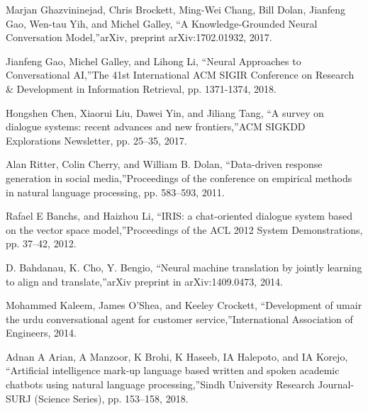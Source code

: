 \documentclass[conference]{IEEEtran}
\begin{document}
\begin{thebibliography}{00}
 Marjan Ghazvininejad, Chris Brockett, Ming-Wei Chang, Bill Dolan, Jianfeng Gao, Wen-tau Yih, and Michel Galley, \textquotedblleft A Knowledge-Grounded Neural Conversation Model,\textquotedblright \hspace{1mm}arXiv, preprint arXiv:1702.01932, 2017.

 Jianfeng Gao, Michel Galley, and Lihong Li, \textquotedblleft Neural Approaches to Conversational AI,\textquotedblright \hspace{1mm}The 41st International ACM SIGIR Conference on Research \& Development in Information Retrieval, pp. 1371-1374, 2018.

 Hongshen Chen, Xiaorui Liu, Dawei Yin, and Jiliang Tang, \textquotedblleft A survey on dialogue systems: recent advances and new frontiers,\textquotedblright \hspace{1mm}ACM SIGKDD Explorations Newsletter, pp. 25--35, 2017.

 Alan Ritter, Colin Cherry, and William B. Dolan, \textquotedblleft Data-driven response generation in social media,\textquotedblright \hspace{1mm}Proceedings of the conference on empirical methods in natural language processing, pp. 583--593, 2011.

 Rafael E Banchs, and Haizhou Li, \textquotedblleft IRIS: a chat-oriented dialogue system based on the vector space model,\textquotedblright \hspace{1mm}Proceedings of the ACL 2012 System Demonstrations, pp. 37--42, 2012.

 D. Bahdanau, K. Cho, Y. Bengio, \textquotedblleft Neural machine translation by jointly learning to align and translate,\textquotedblright \hspace{1mm}arXiv preprint in arXiv:1409.0473, 2014.

 Mohammed Kaleem, James O'Shea, and Keeley Crockett, \textquotedblleft Development of umair the urdu conversational agent for customer service,\textquotedblright \hspace{1mm}International Association of Engineers, 2014.

 Adnan A Arian, A Manzoor, K Brohi, K Haseeb, IA Halepoto, and IA Korejo, \textquotedblleft Artificial intelligence mark-up language based written and spoken academic chatbots using natural language processing,\textquotedblright \hspace{1mm}Sindh University Research Journal-SURJ (Science Series), pp. 153--158, 2018.


\end{thebibliography}
\end{document}
